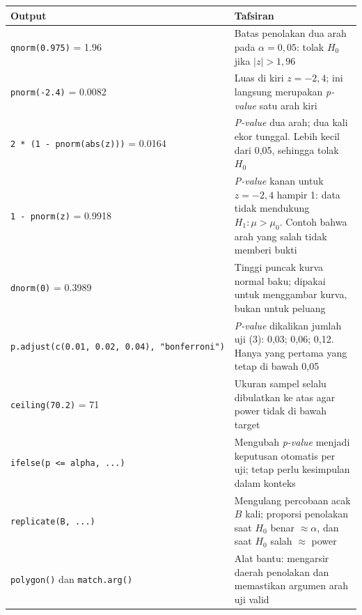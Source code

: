 \documentclass[
  indonesian,
  letterpaper,
]{book}
\newcounter{none} %
\begin{document}
{\def\LTcaptype{none} %
\begin{longtable}[]{@{}
  >{\raggedright\arraybackslash}p{}
  >{\raggedright\arraybackslash}p{}@{}}
\toprule\noalign{}
\begin{minipage}[b]{\linewidth}\raggedright
Output
\end{minipage} & \begin{minipage}[b]{\linewidth}\raggedright
Tafsiran
\end{minipage} \\
\midrule\noalign{}
\endhead
\bottomrule\noalign{}
\endlastfoot
\texttt{qnorm(0.975)} = 1.96 & Batas penolakan dua arah pada
\(\alpha = 0{,}05\): tolak \(H_0\) jika \(\lvert z \rvert > 1{,}96\) \\
\texttt{pnorm(-2.4)} = 0.0082 & Luas di kiri \(z = -2{,}4\); ini
langsung merupakan \emph{p-value} satu arah kiri \\
\texttt{2\ *\ (1\ -\ pnorm(abs(z)))} = 0.0164 & \emph{P-value} dua arah;
dua kali ekor tunggal. Lebih kecil dari 0,05, sehingga tolak \(H_0\) \\
\texttt{1\ -\ pnorm(z)} = 0.9918 & \emph{P-value} kanan untuk
\(z = -2{,}4\) hampir 1: data tidak mendukung \(H_1: \mu > \mu_0\).
Contoh bahwa arah yang salah tidak memberi bukti \\
\texttt{dnorm(0)} = 0.3989 & Tinggi puncak kurva normal baku; dipakai
untuk menggambar kurva, bukan untuk peluang \\
\texttt{p.adjust(c(0.01,\ 0.02,\ 0.04),\ "bonferroni")} & \emph{P-value}
dikalikan jumlah uji (3): 0,03; 0,06; 0,12. Hanya yang pertama yang
tetap di bawah 0,05 \\
\texttt{ceiling(70.2)} = 71 & Ukuran sampel selalu dibulatkan ke atas
agar power tidak di bawah target \\
\texttt{ifelse(p\ \textless{}=\ alpha,\ ...)} & Mengubah \emph{p-value}
menjadi keputusan otomatis per uji; tetap perlu kesimpulan dalam
konteks \\
\texttt{replicate(B,\ ...)} & Mengulang percobaan acak \(B\) kali;
proporsi penolakan saat \(H_0\) benar \(\approx \alpha\), dan saat
\(H_0\) salah \(\approx\) power \\
\texttt{polygon()} dan \texttt{match.arg()} & Alat bantu: mengarsir
daerah penolakan dan memastikan argumen arah uji valid \\
\end{longtable}
}
\end{document}
